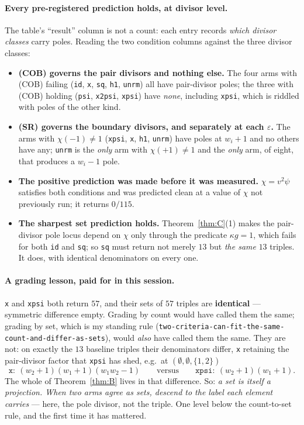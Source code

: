 \documentclass[11pt]{article}
\theoremstyle{plain}
\theoremstyle{definition}
\theoremstyle{remark}
\theoremstyle{plain}
\begin{document}
\paragraph{Every pre-registered prediction holds, at divisor level.}
The table's ``result'' column is not a count: each entry records \emph{which
divisor classes} carry poles.  Reading the two condition columns against the
three divisor classes:
\begin{itemize}
\item \textbf{(COB) governs the pair divisors and nothing else.}  The four
  arms with (COB) failing (\texttt{id}, \texttt{x}, \texttt{sq}, \texttt{h1},
  \texttt{unrm}) all have pair-divisor poles; the three with (COB) holding
  (\texttt{psi}, \texttt{x2psi}, \texttt{xpsi}) have \emph{none}, including
  \texttt{xpsi}, which is riddled with poles of the other kind.
\item \textbf{(SR) governs the boundary divisors, and separately at each
  $\varepsilon$.}  The arms with $\chi(-1)\ne1$ (\texttt{xpsi}, \texttt{x},
  \texttt{h1}, \texttt{unrm}) have poles at $w_i+1$ and no others have any;
  \texttt{unrm} is the \emph{only} arm with $\chi(+1)\ne1$ and the \emph{only}
  arm, of eight, that produces a $w_i-1$ pole.
\item \textbf{The positive prediction was made before it was measured.}
  $\chi=v^2\psi$ satisfies both conditions and was predicted clean at a value of
  $\chi$ not previously run; it returns $0/115$.
\item \textbf{The sharpest set prediction holds.}  Theorem~\ref{thm:C}(1) makes
  the pair-divisor pole locus depend on $\chi$ only through the predicate
  $\kappa g=1$, which fails for both \texttt{id} and \texttt{sq}; so \texttt{sq}
  must return not merely $13$ but \emph{the same} $13$ triples.  It does, with
  identical denominators on every one.
\end{itemize}

\paragraph{A grading lesson, paid for in this session.}
\texttt{x} and \texttt{xpsi} both return $57$, and their sets of $57$ triples are
\textbf{identical} --- symmetric difference empty.  Grading by count would have
called them the same; grading by set, which is my standing rule
(\texttt{two-criteria-can-fit-the-same-count-and-differ-as-sets}), would
\emph{also} have called them the same.  They are not: on exactly the $13$
baseline triples their denominators differ, \texttt{x} retaining the pair-divisor
factor that \texttt{xpsi} has shed, e.g.\ at $(\emptyset,\emptyset,\{1,2\})$
\[
  \texttt{x}:\ (w_2+1)(w_1+1)(w_1w_2-1)
  \qquad\text{versus}\qquad
  \texttt{xpsi}:\ (w_2+1)(w_1+1).
\]
The whole of Theorem~\ref{thm:B} lives in that difference.  So: \emph{a set is
itself a projection.  When two arms agree as sets, descend to the label each
element carries} --- here, the pole divisor, not the triple.  One level below the
count-to-set rule, and the first time it has mattered.
\end{document}
